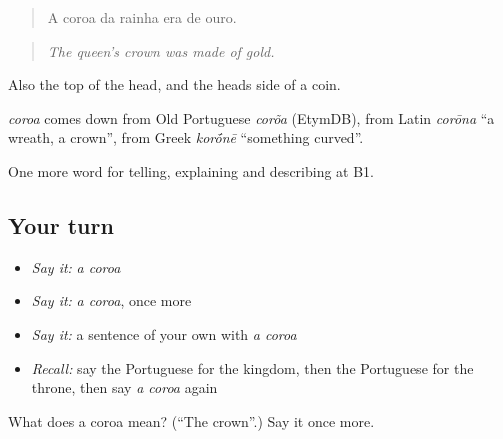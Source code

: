 \begin{quote}
A coroa da rainha era de ouro.
\end{quote}

\begin{quote}
\emph{The queen’s crown was made of gold.}
\end{quote}

Also the top of the head, and the heads side of a coin.

\begin{cousinweb}
\emph{coroa} comes down from Old Portuguese \emph{corõa} (EtymDB), from Latin \emph{corōna} \textquotedblleft{}a wreath, a crown\textquotedblright{}, from Greek \emph{kor\'{\={o}}nē} \textquotedblleft{}something curved\textquotedblright{}.
\end{cousinweb}

\begin{grammarlens}[title={What you've built}]
One more word for telling, explaining and describing at B1.
\end{grammarlens}

\subsection*{Your turn}
\begin{itemize}
\raggedright
  \item \emph{Say it:} \emph{a coroa}
  \item \emph{Say it:} \emph{a coroa}, once more
  \item \emph{Say it:} a sentence of your own with \emph{a coroa}
  \item \emph{Recall:} say the Portuguese for the kingdom, then the Portuguese for the throne, then say \emph{a coroa} again
\end{itemize}

\begin{tcolorbox}[breakable,colback=teal!4,colframe=teal!35!black,title={Before you move on}]
What does a coroa mean? (\textquotedblleft{}The crown\textquotedblright{}.) Say it once more.
\end{tcolorbox}
